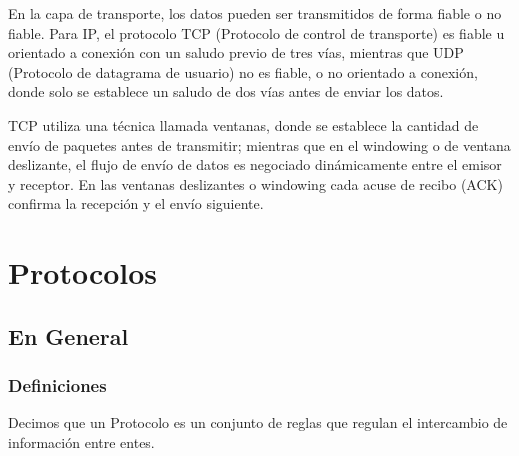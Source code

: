 \documentclass[12pt, fleqn]{report}                             %
\theoremstyle{break}                                            %
\begin{document}
            En la capa de transporte, los datos pueden ser transmitidos de forma fiable o no fiable.
            Para IP, el protocolo TCP (Protocolo de control de transporte) es fiable u orientado a 
            conexión con un saludo previo de tres vías, mientras que UDP (Protocolo de datagrama de
            usuario) no es fiable, o no orientado a conexión, donde solo se establece un saludo de dos
            vías antes de enviar los datos.

            TCP utiliza una técnica llamada ventanas, donde se establece la cantidad de envío de paquetes
            antes de transmitir; mientras que en el windowing o de ventana deslizante, el flujo de envío
            de datos es negociado dinámicamente entre el emisor y receptor. En las ventanas deslizantes
            o windowing cada acuse de recibo (ACK) confirma la recepción y el envío siguiente.




\part{Protocolos}
\clearpage

    \chapter{En General}

        \clearpage
        \section{Definiciones}

            Decimos que un Protocolo es un conjunto de reglas que regulan el intercambio de
            información entre entes.
\end{document}
